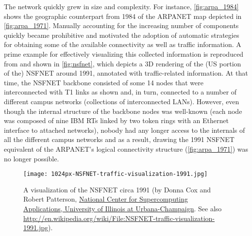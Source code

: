 The network quickly grew in size and complexity. For instance,
\autoref{fig:arpa_1984} shows the geographic counterpart from 1984 of
the ARPANET map depicted in \autoref{fig:arpa_1971}.  Manually
accounting for the increasing number of components quickly became
prohibitive and motivated the adoption of automatic strategies for
obtaining some of the available connectivity as well as traffic
information.  A prime example for effectively visualizing this
collected information is reproduced from
\cite{frazer:_merit_histor_nsfnet_backb_projec} and shown in
\autoref{fig:nsfnet}, which depicts a 3D rendering of the (US portion
of the) NSFNET around 1991, annotated with traffic-related
information. At that time, the NSFNET backbone consisted of some 14
nodes that were interconnected with T1 links as shown and, in turn,
connected to a number of different campus networks (\eg collections of
interconnected LANs). However, even though the internal structure of
the backbone nodes was well-known (\ie each node was composed of nine
IBM RTs linked by two token rings with an Ethernet interface to
attached networks), nobody had any longer access to the internals of
all the different campus networks and as a result, drawing the 1991
NSFNET equivalent of the ARPANET's logical connectivity structure
(\autoref{fig:arpa_1971}) was no longer possible.
 
\begin{figure}[thbp]
  \begin{center}
    \texttt{[image: 1024px-NSFNET-traffic-visualization-1991.jpg]}
    \caption{A visualization of the NSFNET circa 1991 (by Donna Cox
and Robert Patterson,
\href{http://avl.ncsa.illinois.edu/project-archive/visualizing-the-early-internet}{National
Center for Supercomputing Applications, University of Illinois at
Urbana-Champaign}. See also
\url{http://en.wikipedia.org/wiki/File:NSFNET-traffic-visualization-1991.jpg}).
      \label{fig:nsfnet}}
  \end{center}
\end{figure}

